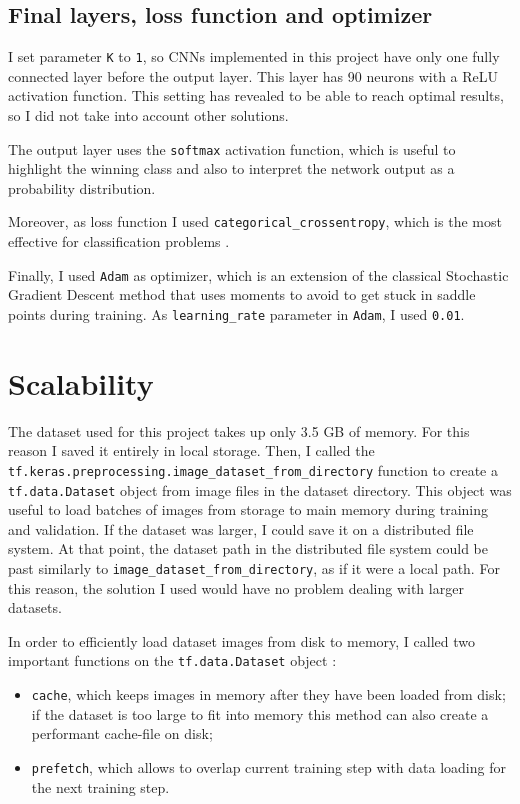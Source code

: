 \documentclass{article}
\begin{document}
\subsection{Final layers, loss function and optimizer}
I set parameter \texttt{K} to \texttt{1}, so CNNs implemented in this project have only one fully connected layer before the output layer.
This layer has 90 neurons with a ReLU activation function.
This setting has revealed to be able to reach optimal results, so I did not take into account other solutions.

The output layer uses the \texttt{softmax} activation function, which is useful to highlight the winning class and also to interpret the network output as a probability distribution.

Moreover, as loss function I used \texttt{cate\-gorical\_cross\-entropy}, which is the most effective for classification problems \cite{cross_entropy}.

Finally, I used \texttt{Adam} as optimizer, which is an extension of the classical Stochastic Gradient Descent method that uses moments to avoid to get stuck in saddle points during training.
As \texttt{learning\_rate} parameter in \texttt{Adam}, I used \texttt{0.01}.

\section{Scalability}
The dataset used for this project takes up only 3.5 GB of memory. For this reason I saved it entirely in local storage.
Then, I called the \texttt{tf\-.keras\-.pre\-pro\-ces\-sing\-.image\_\-dataset\_\-from\_\-directory} function to create a \texttt{tf.data.Dataset} object from image files in the dataset directory.
This object was useful to load batches of images from storage to main memory during training and validation.
If the dataset was larger, I could save it on a distributed file system.
At that point, the dataset path in the distributed file system could be past similarly to \texttt{image\_\-dataset\_\-from\_\-directory}, as if it were a local path.
For this reason, the solution I used would have no problem dealing with larger datasets.

In order to efficiently load dataset images from disk to memory, I called two important functions on the \texttt{tf.data.Dataset} object \cite{tfPerformance}:
\begin{itemize}
    \item \texttt{cache}, which keeps images in memory after they have been loaded from disk; if the dataset is too large to fit into memory this method can also create a performant cache-file on disk;
    \item \texttt{prefetch}, which allows to overlap current training step with data loading for the next training step.
\end{itemize}
\end{document}
